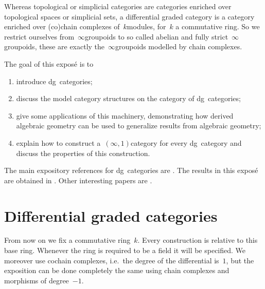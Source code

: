 Whereas topological or simplicial categories are categories enriched over topological spaces or simplicial sets, a differential graded category is a category enriched over (co)chain complexes of~$k$\dash modules, for~$k$ a commutative ring. So we restrict ourselves from~$\infty$\dash groupoids to so called abelian and fully strict~$\infty$\dash groupoids, these are exactly the~$\infty$\dash groupoids modelled by chain complexes.

The goal of this expos\'e is to
\begin{enumerate}
  \item introduce dg~categories;
  \item discuss the model category structures on the category of dg~categories;
  \item give some applications of this machinery, demonstrating how derived algebraic geometry can be used to generalize results from algebraic geometry;
  \item explain how to construct a~$(\infty,1)$\dash category for every dg~category and discuss the properties of this construction.
\end{enumerate}

The main expository references for dg~categories are \cite{lnm2008,keller}. The results in this expos\'e are obtained in \cite{toen}. Other interesting papers are \cite{toen-vaquie}.


\section{Differential graded categories}
From now on we fix a commutative ring~$k$. Every construction is relative to this base ring. Whenever the ring is required to be a field it will be specified. We moreover use cochain complexes, i.e.\ the degree of the differential is~$1$, but the exposition can be done completely the same using chain complexes and morphisms of degree~$-1$.

